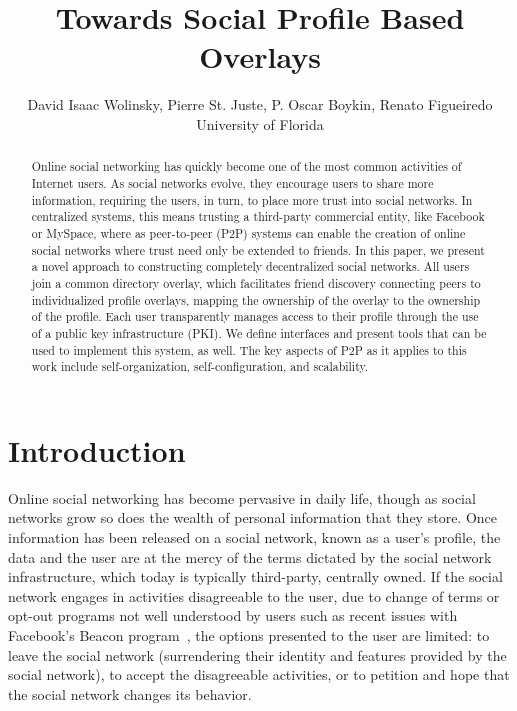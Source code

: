 \documentclass[conference]{IEEEtran}
\begin{document}
\title{Towards Social Profile Based Overlays}

\author{
David Isaac Wolinsky,
Pierre St. Juste,
P. Oscar Boykin,
Renato Figueiredo
\\
University of Florida
\\
}

\maketitle

\begin{abstract}

Online social networking has quickly become one of the most common activities
of Internet users.  As social networks evolve, they encourage users to share
more information, requiring the users, in turn, to place more trust into
social networks.  In centralized systems, this means trusting a third-party
commercial entity, like Facebook or MySpace, where as peer-to-peer (P2P)
systems can enable the creation of online social networks where trust need
only be extended to friends.  In this paper, we present a novel approach to
constructing completely decentralized social networks.  All users join a
common directory overlay, which facilitates friend discovery connecting peers
to individualized profile overlays, mapping the ownership of the overlay to
the ownership of the profile.  Each user transparently manages access to their
profile through the use of a public key infrastructure (PKI).  We define
interfaces and present tools that can be used to implement this system, as
well.  The key aspects of P2P as it applies to this work include
self-organization, self-configuration, and scalability.

\end{abstract}

\section{Introduction}

Online social networking has become pervasive in daily life, though as social
networks grow so does the wealth of personal information that they store.
Once information has been released on a social network, known as a user's
profile, the data and the user are at the mercy of the terms dictated by the
social network infrastructure, which today is typically third-party, centrally
owned.  If the social network engages in activities disagreeable to the user,
due to change of terms or opt-out programs not well understood by users such
as recent issues with Facebook's Beacon program~\cite{facebook_beacon}, the
options presented to the user are limited: to leave the social network
(surrendering their identity and features provided by the social network), to
accept the disagreeable activities, or to petition and hope that the social
network changes its behavior. 
\end{document}
